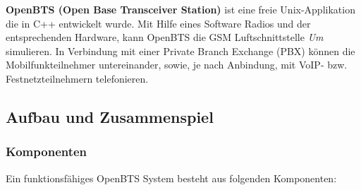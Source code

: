 \textbf{OpenBTS (Open Base Transceiver Station)} ist eine freie Unix-Applikation die in C++ entwickelt wurde. Mit Hilfe eines Software Radios und der entsprechenden Hardware, kann OpenBTS die GSM Luftschnittstelle \textit{Um} simulieren. In Verbindung mit einer Private Branch Exchange (PBX) können die Mobilfunkteilnehmer untereinander, sowie, je nach Anbindung, mit VoIP- bzw. Festnetzteilnehmern telefonieren.

\subsection{Aufbau und Zusammenspiel}
\subsubsection{Komponenten}
Ein funktionsfähiges OpenBTS System besteht aus folgenden Komponenten:

